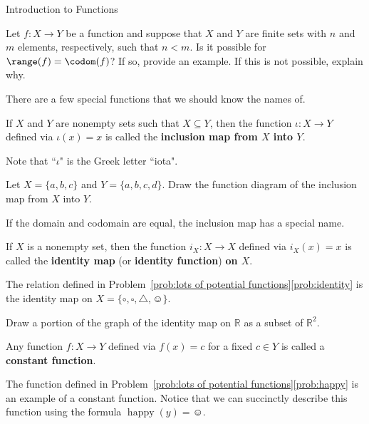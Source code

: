 \begin{section}{Introduction to Functions}
\begin{problem}
Let $f:X\to Y$ be a function and suppose that $X$ and $Y$ are finite sets with $n$ and $m$ elements, respectively, such that $n<m$.  Is it possible for $\range(f)=\codom(f)$?  If so, provide an example.  If this is not possible, explain why.
\end{problem}

There are a few special functions that we should know the names of.

\begin{definition}
If $X$ and $Y$ are nonempty sets such that $X\subseteq Y$, then the function $\iota:X\to Y$ defined via $\iota(x)=x$ is called the \textbf{inclusion map from $X$ into $Y$}.
\end{definition}

Note that ``$\iota$" is the Greek letter ``iota".

\begin{problem}
Let $X=\{a,b,c\}$ and $Y=\{a,b,c,d\}$.  Draw the function diagram of the inclusion map from $X$ into $Y$.
\end{problem}

If the domain and codomain are equal, the inclusion map has a special name.

\begin{definition}
If $X$ is a nonempty set, then the function $i_X:X\to X$ defined via $i_X(x)=x$ is called the \textbf{identity map} (or \textbf{identity function}) \textbf{on $X$}.
\end{definition}

\begin{example}
The relation defined in Problem~\ref{prob:lots of potential functions}\ref{prob:identity} is the identity map on $X=\{\circ, \square,\triangle,\smiley\}$.
\end{example}

\begin{problem}
Draw a portion of the graph of the identity map on $\mathbb{R}$ as a subset of $\mathbb{R}^2$.
\end{problem}

\begin{definition}
Any function $f:X\to Y$ defined via $f(x)=c$ for a fixed $c\in Y$ is called a \textbf{constant function}.
\end{definition}

\begin{example}
The function defined in Problem~\ref{prob:lots of potential functions}\ref{prob:happy} is an example of a constant function.  Notice that we can succinctly describe this function using the formula $\operatorname{happy}(y)=\smiley$.
\end{example}


\end{section}

